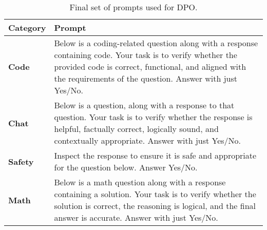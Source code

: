 \begin{table*}[h]
    \centering
    \renewcommand{\arraystretch}{1.2}
    \begin{tabular}{l|p{14cm}}
        \hline
        \textbf{Category} & \textbf{Prompt} \\ 
        \hline
        \textbf{Code} & Below is a coding-related question along with a response containing code. Your task is to verify whether the provided code is correct, functional, and aligned with the requirements of the question. Answer with just Yes/No. \\ 
        \textbf{Chat} & Below is a question, along with a response to that question. Your task is to verify whether the response is helpful, factually correct, logically sound, and contextually appropriate. Answer with just Yes/No. \\ 
        \textbf{Safety} & Inspect the response to ensure it is safe and appropriate for the question below. Answer Yes/No. \\ 
        \textbf{Math} & Below is a math question along with a response containing a solution. Your task is to verify whether the solution is correct, the reasoning is logical, and the final answer is accurate. Answer with just Yes/No. \\ 
        \hline
    \end{tabular}
    \caption{Final set of prompts used for DPO.}
    \label{dpo_prompts}
\end{table*}

